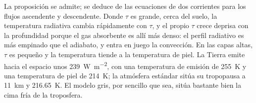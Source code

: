 La proposición se admite; se deduce de las ecuaciones de dos corrientes para
los flujos ascendente y descendente. Donde $\tau$ es grande, cerca del suelo,
la temperatura radiativa cambia rápidamente con $\tau$, y el propio $\tau$
crece deprisa con la profundidad porque el gas absorbente es allí más denso: el
perfil radiativo es más empinado que el adiabato, y entra en juego la convección.
En las capas altas, $\tau$ es pequeño y la temperatura tiende a la
temperatura de piel. La Tierra emite hacia el espacio unos \qty{239}{W.m^{-2}}, con
una temperatura de emisión de \qty{255}{K} y una temperatura de piel de
\qty{214}{K}; la atmósfera estándar sitúa su tropopausa a \qty{11}{km}
y \qty{216.65}{K}. El modelo gris, por sencillo que sea, sitúa bastante bien la cima fría de
la troposfera.

